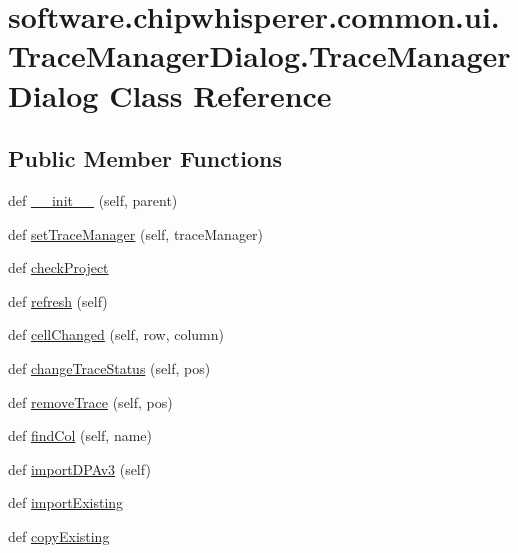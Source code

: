 \hypertarget{classsoftware_1_1chipwhisperer_1_1common_1_1ui_1_1TraceManagerDialog_1_1TraceManagerDialog}{}\section{software.\+chipwhisperer.\+common.\+ui.\+Trace\+Manager\+Dialog.\+Trace\+Manager\+Dialog Class Reference}
\label{classsoftware_1_1chipwhisperer_1_1common_1_1ui_1_1TraceManagerDialog_1_1TraceManagerDialog}
\subsection*{Public Member Functions}
\begin{DoxyCompactItemize}
\item 
def \hyperlink{classsoftware_1_1chipwhisperer_1_1common_1_1ui_1_1TraceManagerDialog_1_1TraceManagerDialog_a7d57a6ce74f70b11acfe3f9d7537a77e}{\+\_\+\+\_\+init\+\_\+\+\_\+} (self, parent)
\item 
def \hyperlink{classsoftware_1_1chipwhisperer_1_1common_1_1ui_1_1TraceManagerDialog_1_1TraceManagerDialog_ae1bfd8fa403fb510e21accde3eab3f74}{set\+Trace\+Manager} (self, trace\+Manager)
\item 
def \hyperlink{classsoftware_1_1chipwhisperer_1_1common_1_1ui_1_1TraceManagerDialog_1_1TraceManagerDialog_a8865154eaa482257d5bf47af95a6bde3}{check\+Project}
\item 
def \hyperlink{classsoftware_1_1chipwhisperer_1_1common_1_1ui_1_1TraceManagerDialog_1_1TraceManagerDialog_a5424cb507c1ef3b88ea8968a7852b05e}{refresh} (self)
\item 
def \hyperlink{classsoftware_1_1chipwhisperer_1_1common_1_1ui_1_1TraceManagerDialog_1_1TraceManagerDialog_a182799ebe9a0160d0e63733dafd6501d}{cell\+Changed} (self, row, column)
\item 
def \hyperlink{classsoftware_1_1chipwhisperer_1_1common_1_1ui_1_1TraceManagerDialog_1_1TraceManagerDialog_a36d07b45f6515fd18b227c57fb678288}{change\+Trace\+Status} (self, pos)
\item 
def \hyperlink{classsoftware_1_1chipwhisperer_1_1common_1_1ui_1_1TraceManagerDialog_1_1TraceManagerDialog_a0cf04acde65e64cfa3fb8a0a0ed28e92}{remove\+Trace} (self, pos)
\item 
def \hyperlink{classsoftware_1_1chipwhisperer_1_1common_1_1ui_1_1TraceManagerDialog_1_1TraceManagerDialog_a6169d8f4a68f0aa7aae52ee89be25b54}{find\+Col} (self, name)
\item 
def \hyperlink{classsoftware_1_1chipwhisperer_1_1common_1_1ui_1_1TraceManagerDialog_1_1TraceManagerDialog_a53fa5e69e6b6aaac74d51f5d1c78162a}{import\+D\+P\+Av3} (self)
\item 
def \hyperlink{classsoftware_1_1chipwhisperer_1_1common_1_1ui_1_1TraceManagerDialog_1_1TraceManagerDialog_a3f19bdc3b6fd0b001dfbe50e792f0ffe}{import\+Existing}
\item 
def \hyperlink{classsoftware_1_1chipwhisperer_1_1common_1_1ui_1_1TraceManagerDialog_1_1TraceManagerDialog_a68fab954b885ed29ae04c9bd94890a26}{copy\+Existing}
\end{DoxyCompactItemize}
